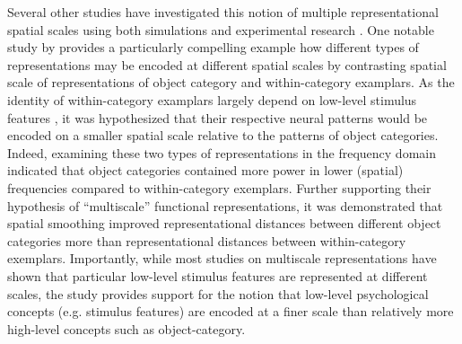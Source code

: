 \documentclass[jou,12pt,a4paper]{apa6}
\begin{document}
Several other studies have investigated this notion of multiple representational spatial scales using both simulations \cite{bulthe2014} and experimental research \cite{drucker2009,swisher2010,bulthe2015}. One notable study by  provides a particularly compelling example how different types of representations may be encoded at different spatial scales by contrasting spatial scale of representations of object category and within-category examplars. As the identity of within-category examplars largely depend on low-level stimulus features \cite{eger2008,rice2014}, it was hypothesized that their respective neural patterns would be encoded on a smaller spatial scale relative to the patterns of object categories. Indeed, examining these two types of representations in the frequency domain indicated that object categories contained more power in lower (spatial) frequencies compared to within-category exemplars. Further supporting their hypothesis of ``multiscale'' functional representations, it was demonstrated that spatial smoothing improved representational distances between different object categories more than representational distances between within-category exemplars. Importantly, while most studies on multiscale representations have shown that particular low-level stimulus features are represented at different scales, the  study provides support for the notion that low-level psychological concepts (e.g. stimulus features) are encoded at a finer scale than relatively more high-level concepts such as object-category. 
\end{document}

